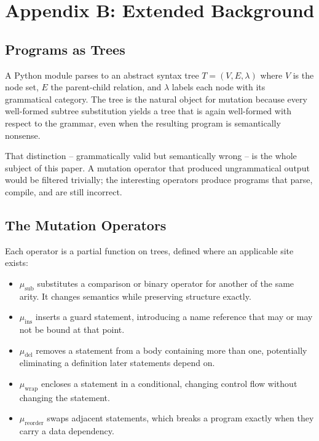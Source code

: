 \documentclass{article}
\begin{document}
\section{Appendix B: Extended Background}



\subsection{Programs as Trees}


A Python module parses to an abstract syntax tree $T = (V, E, \lambda)$ where $V$ is the node set, $E$ the parent-child relation, and $\lambda$ labels each node with its grammatical category. The tree is the natural object for mutation because every well-formed subtree substitution yields a tree that is again well-formed with respect to the grammar, even when the resulting program is semantically nonsense.

That distinction -- grammatically valid but semantically wrong -- is the whole subject of this paper. A mutation operator that produced ungrammatical output would be filtered trivially; the interesting operators produce programs that parse, compile, and are still incorrect.


\subsection{The Mutation Operators}


Each operator is a partial function on trees, defined where an applicable site exists:

\begin{itemize}
  \item $\mu_{\text{sub}}$ substitutes a comparison or binary operator for another of the same arity. It changes semantics while preserving structure exactly.
  \item $\mu_{\text{ins}}$ inserts a guard statement, introducing a name reference that may or may not be bound at that point.
  \item $\mu_{\text{del}}$ removes a statement from a body containing more than one, potentially eliminating a definition later statements depend on.
  \item $\mu_{\text{wrap}}$ encloses a statement in a conditional, changing control flow without changing the statement.
  \item $\mu_{\text{reorder}}$ swaps adjacent statements, which breaks a program exactly when they carry a data dependency.
\end{itemize}
\end{document}
